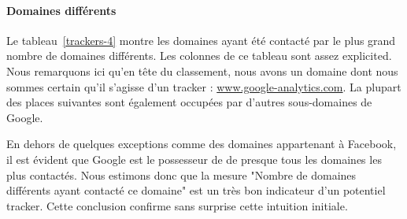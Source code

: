 			\paragraph{Domaines différents} Le tableau~\ref{trackers-4} montre les domaines ayant été contacté par le plus grand nombre de domaines différents. Les colonnes de ce tableau sont assez explicited. Nous remarquons ici qu'en tête du classement, nous avons un domaine dont nous sommes certain qu'il s'agisse d'un tracker : \url{www.google-analytics.com}. La plupart des places suivantes sont également occupées par d'autres sous-domaines de Google.

			En dehors de quelques exceptions comme des domaines appartenant à Facebook, il est évident que Google est le possesseur de de presque tous les domaines les plus contactés. Nous estimons donc que la mesure "Nombre de domaines différents ayant contacté ce domaine" est un très bon indicateur d'un potentiel tracker. Cette conclusion confirme sans surprise cette intuition initiale.

